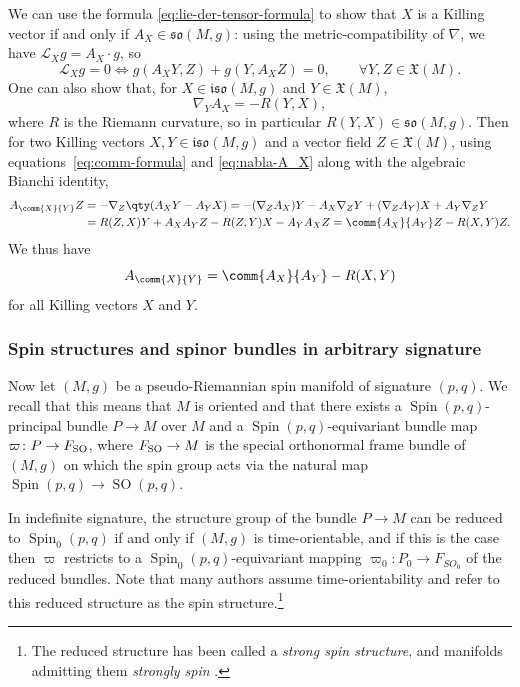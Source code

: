 \documentclass[10pt,a4paper]{amsart}
\numberwithin{equation}{section}
\newcommand{\fso}{\mathfrak{so}}
\newcommand{\fiso}{\mathfrak{iso}}
\newcommand{\fX}{\mathfrak{X}}
\newcommand{\eL}{\mathscr{L}}
\newcommand{\1}{\mathbbm{1}}
\DeclareMathOperator{\Spin}{Spin}
\DeclareMathOperator{\SO}{SO}
\begin{document}
We can use the formula \eqref{eq:lie-der-tensor-formula} to show that $X$ is a Killing vector if and only if $A_X\in\fso(M,g)$: using the metric-compatibility of $\nabla$, we have $\eL_X g = A_X\cdot g$, so
\begin{equation}\label{eq:killing-condition}
	\eL_X g = 0 \iff g(A_X Y, Z) + g(Y,A_X Z) = 0,\qquad\forall Y,Z\in\fX(M).
\end{equation}
One can also show \cite[Lemma~2.2]{Kostant1955} that, for $X\in\fiso(M,g)$ and $Y\in\fX(M)$,
\begin{equation}\label{eq:nabla-A_X}
	\nabla_Y A_X = -R(Y,X),
\end{equation}
where $R$ is the Riemann curvature, so in particular $R(Y,X)\in\fso(M,g)$. Then for two Killing vectors $X,Y\in\fiso(M,g)$ and a vector field $Z\in\fX(M)$, using equations~\eqref{eq:comm-formula} and \eqref{eq:nabla-A_X} along with the algebraic Bianchi identity,
\begin{align*}
	A_{\comm{X}{Y}}Z
		&= -\nabla_Z\qty(A_X Y - A_Y X)= -(\nabla_ZA_X)Y - A_X\nabla_ZY + (\nabla_ZA_Y)X + A_Y\nabla_ZY\\
		&= R(Z,X)Y + A_XA_YZ - R(Z,Y)X- A_YA_XZ= \comm{A_X}{A_Y}Z - R(X,Y)Z.
\end{align*}
We thus have
\begin{equation}\label{eq:A-comm}
	A_{\comm{X}{Y}} = \comm{A_X}{A_Y} - R(X,Y)
\end{equation}
for all Killing vectors $X$ and $Y$.

\subsubsection{Spin structures and spinor bundles in arbitrary signature}
\label{sec:spin-structures}

Now let $(M,g)$ be a pseudo-Riemannian spin manifold of signature $(p,q)$. We recall that this means that $M$ is oriented and that there exists a $\Spin(p,q)$-principal bundle $P\to M$ over $M$ and a $\Spin(p,q)$-equivariant bundle map $\varpi\colon P\to F_{\rm SO}$, where $F_{\rm SO}\to M$ is the special orthonormal frame bundle of $(M,g)$ on which the spin group acts via the natural map $\Spin(p,q)\to\SO(p,q)$.

In indefinite signature, the structure group of the bundle $P\to M$ can be reduced to $\Spin_0(p,q)$ if and only if $(M,g)$ is time-orientable, and if this is the case then $\varpi$ restricts to a $\Spin_0(p,q)$-equivariant mapping $\varpi_0\colon P_0\to F_{SO_0}$ of the reduced bundles. Note that many authors assume time-orientability and refer to this reduced structure as the spin structure.\footnote{The reduced structure has been called a \emph{strong spin structure}, and manifolds admitting them \emph{strongly spin} \cite{Cortes2021,Shahbazi2024_2,Shahbazi2024_1}.}
	
\end{document}

